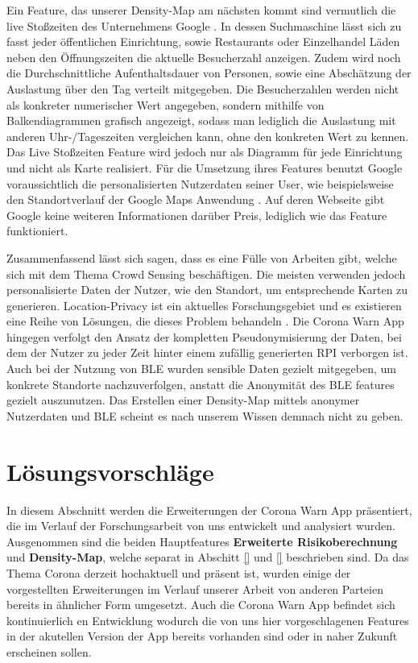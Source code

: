 \documentclass[conference]{IEEEtran}
\begin{document}
Ein Feature, das unserer Density-Map am nächsten kommt sind vermutlich die live Stoßzeiten des Unternehmens Google \cite{GoogleStosszeiten}.  
In dessen Suchmaschine lässt sich zu fasst jeder öffentlichen Einrichtung, sowie Restaurants oder Einzelhandel Läden neben den Öffnungszeiten die aktuelle Besucherzahl anzeigen. 
Zudem wird noch die Durchschnittliche Aufenthaltsdauer von Personen, sowie eine Abschätzung der Auslastung über den Tag verteilt mitgegeben. 
Die Besucherzahlen werden nicht als konkreter numerischer Wert angegeben, sondern mithilfe von Balkendiagrammen grafisch angezeigt, sodass man lediglich die Auslastung mit anderen Uhr-/Tageszeiten vergleichen kann, ohne den konkreten Wert zu kennen. 
Das Live Stoßzeiten Feature wird jedoch nur als Diagramm für jede Einrichtung und nicht als Karte realisiert.
Für die Umsetzung ihres Features benutzt Google voraussichtlich die personalisierten Nutzerdaten seiner User, wie beispielsweise den Standortverlauf der Google Maps Anwendung \cite{GoogleStandortverlauf}. 
Auf deren Webseite gibt Google keine weiteren Informationen darüber Preis, lediglich wie das Feature funktioniert. 

Zusammenfassend lässt sich sagen, dass es eine Fülle von Arbeiten gibt, welche sich mit dem Thema Crowd Sensing beschäftigen. 
Die meisten verwenden jedoch personalisierte Daten der Nutzer, wie den Standort, um entsprechende Karten zu generieren. 
Location-Privacy ist ein aktuelles Forschungsgebiet und es existieren eine Reihe von Lösungen, die dieses Problem behandeln \cite{Location}. 
Die Corona Warn App hingegen verfolgt den Ansatz der kompletten Pseudonymisierung der Daten, bei dem der Nutzer zu jeder Zeit hinter einem zufällig generierten RPI verborgen ist. 
Auch bei der Nutzung von BLE wurden sensible Daten gezielt mitgegeben, um konkrete Standorte nachzuverfolgen, anstatt die Anonymität des BLE features gezielt auszunutzen. 
Das Erstellen einer Density-Map mittels anonymer Nutzerdaten und BLE scheint es nach unserem Wissen demnach nicht zu geben. 

\section{Lösungsvorschläge} \label{Nebenfeatures}
In diesem Abschnitt werden die Erweiterungen der Corona Warn App präsentiert, die im Verlauf der Forschungsarbeit von uns entwickelt und analysiert wurden. 
Ausgenommen sind die beiden Hauptfeatures \textbf{Erweiterte Risikoberechnung} und \textbf{Density-Map}, welche separat in Abschitt \ref{} und \ref{} beschrieben sind.
Da das Thema Corona derzeit hochaktuell und präsent ist, wurden einige der vorgestellten Erweiterungen im Verlauf unserer Arbeit von anderen Parteien bereits in ähnlicher Form umgesetzt.
Auch die Corona Warn App befindet sich kontinuierlich en Entwicklung wodurch die von uns hier vorgeschlagenen Features in der akutellen Version der App bereits vorhanden sind oder in naher Zukunft erscheinen sollen. 
\end{document}
